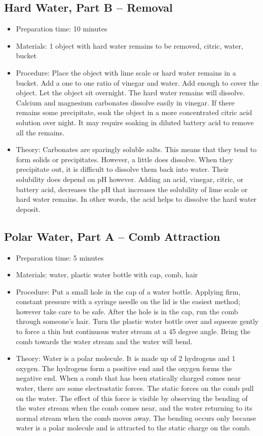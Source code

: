 \subsection{Hard Water, Part B -- Removal}
\begin{itemize}
\item{Preparation time: 10 minutes}
\item{Materials: 1 object with hard water remains to be removed, citric, water, bucket}
\item{Procedure: Place the object with lime scale or hard water remains in a bucket. Add a one to one ratio of vinegar and water. Add enough to cover the object. Let the object sit overnight. The hard water remains will dissolve. Calcium and magnesium carbonates dissolve easily in vinegar. If there remains some precipitate, soak the object in a more concentrated citric acid solution over night. It may require soaking in diluted battery acid to remove all the remains.}
\item{Theory: Carbonates are sparingly soluble salts. This means that they tend to form solids or precipitates. However, a little does dissolve. When they precipitate out, it is difficult to dissolve them back into water. Their solubility does depend on pH however. Adding an acid, vinegar, citric, or battery acid, decreases the pH that increases the solubility of lime scale or hard water remains. In other words, the acid helps to dissolve the hard water deposit.}
\end{itemize}

\subsection{Polar Water, Part A -- Comb Attraction}
\begin{itemize}
\item{Preparation time: 5 minutes}
\item{Materials: water, plastic water bottle with cap, comb, hair}
\item{Procedure: Put a small hole in the cap of a water bottle. Applying firm, constant pressure with a syringe needle on the lid is the easiest method; however take care to be safe. After the hole is in the cap, run the comb through someone’s hair. Turn the plastic water bottle over and squeeze gently to force a thin but continuous water stream at a 45 degree angle. Bring the comb towards the water stream and the water will bend.}
\item{Theory: Water is a polar molecule. It is made up of 2 hydrogens and 1 oxygen. The hydrogens form a positive end and the oxygen forms the negative end. When a comb that has been statically charged comes near water, there are some electrostatic forces. The static forces on the comb pull on the water. The effect of this force is visible by observing the bending of the water stream when the comb comes near, and the water returning to its normal stream when the comb moves away. The bending occurs only because water is a polar molecule and is attracted to the static charge on the comb.}
\end{itemize}

